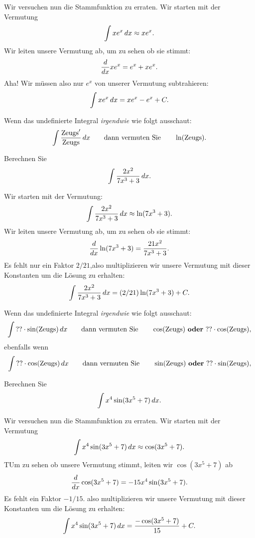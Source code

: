 \begin{solution}
Wir versuchen nun die Stammfunktion zu erraten. Wir starten mit der Vermutung
\[
\int xe^x \, d x \approx xe^x.
\]
Wir leiten unsere Vermutung ab, um zu sehen ob sie stimmt:
\[
\frac{d}{dx} xe^x = e^x + xe^x.
\]
Aha! Wir müssen also nur $e^x$ von unserer Vermutung subtrahieren:
\[
\int xe^x \, d x =xe^x - e^x + C.
\]
\end{solution}





\begin{template}\label{template:lnchain}
Wenn das undefinierte Integral \emph{irgendwie} wie folgt ausschaut:
\[
\int \frac{\mathrm{Zeugs}'}{\mathrm{Zeugs}}\, d x \qquad\text{dann vermuten Sie}\qquad\ln(\mathrm{Zeugs}).
\]
\end{template}

\begin{example}
Berechnen Sie
\[
\int \frac{2x^2}{7x^3 + 3} \, d x.
\]
\end{example}

\begin{solution}Wir starten mit der Vermutung:
\[
\int \frac{2x^2}{7x^3 + 3} \, d x \approx \ln(7x^3+3).
\]
Wir leiten unsere Vermutung ab, um zu sehen ob sie stimmt:
\[
\frac{d}{dx} \ln(7x^3+3) = \frac{21x^2}{7x^3 + 3}.
\]
Es fehlt nur ein Faktor $2/21$,also multiplizieren wir unsere Vermutung mit dieser Konstanten um die Lösung zu erhalten:
\[
\int \frac{2x^2}{7x^3 + 3} \, d x = (2/21)\ln(7x^3+3)+C.
\]
\end{solution}




\begin{template}\label{template:trigchain}
Wenn das undefinierte Integral \emph{irgendwie} wie folgt ausschaut:
\[
\int \mathrm{??}\cdot \sin(\mathrm{Zeugs}) \, d x \qquad\text{dann vermuten Sie}\qquad \cos(\mathrm{Zeugs}) \text{ \textbf{oder} }\mathrm{??}
\cdot \cos(\mathrm{Zeugs}),
\]
ebenfalls wenn  
\[
\int \mathrm{??}\cdot \cos(\mathrm{Zeugs}) \, d x \qquad\text{dann vermuten Sie}\qquad \sin(\mathrm{Zeugs}) \text{ \textbf{oder} }\mathrm{??}
\cdot \sin(\mathrm{Zeugs}),
\]
\end{template}



\begin{example}
Berechnen Sie
\[
\int x^4\sin(3x^5+7) \, d x.
\]
\end{example}


\begin{solution}
Wir versuchen nun die Stammfunktion zu erraten. Wir starten mit der Vermutung
\[
\int x^4\sin(3x^5+7)\, d x \approx \cos(3x^5+7).
\]
TUm zu sehen ob unsere Vermutung stimmt, leiten wir $\cos(3x^5+7)$ ab
\[
\frac{d}{dx} \cos(3x^5+7) = -15x^4\sin(3x^5+7).
\]
Es fehlt ein Faktor $-1/15$. also multiplizieren wir unsere Vermutung mit dieser Konstanten um die Lösung zu erhalten:
\[
\int x^4\sin(3x^5+7) \, d x = \frac{-\cos(3x^5+7)}{15} + C.
\]
\end{solution}





